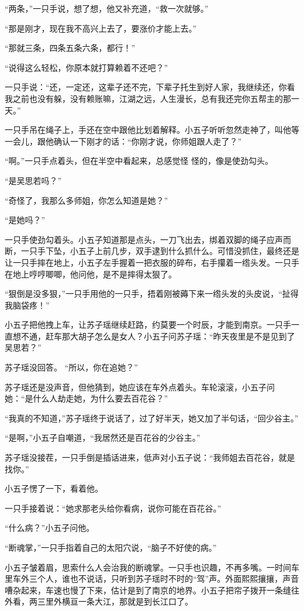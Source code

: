 “两条，”一只手说，想了想，他又补充道，“救一次就够。”

“那是刚才，现在我不高兴上去了，要涨价才能上去。”

“那就三条，四条五条六条，都行！”

“说得这么轻松，你原本就打算赖着不还吧？”

一只手说：“还，一定还，这辈子还不完，下辈子托生到好人家，我继续还，你看我之前也没有躲，没有赖账嘛，江湖之远，人生漫长，总有我还完你五帮主的那一天。”

一只手吊在绳子上，手还在空中跟他比划着解释。小五子听听忽然走神了，叫他等一会儿，跟他确认一下刚才的话：“你刚才说，你师姐跟人走了？”

“啊。”一只手点着头，但在半空中看起来，总感觉怪
怪的，像是使劲勾头。

“是吴思若吗？”

“奇怪了，我那么多师姐，你怎么知道是她？”

“是她吗？”

一只手使劲勾着头。小五子知道那是点头，一刀飞出去，绑着双脚的绳子应声而断，一只手下坠，小五子上前几步，双手逮到什么抓什么。可惜没抓住，最终还是让一只手摔在地上，小五子左手握着一把衣服的碎布，右手攥着一绺头发。一只手在地上哼哼唧唧，他问他，是不是摔得太狠了。

“狠倒是没多狠，”一只手用他的一只手，捂着刚被薅下来一绺头发的头皮说，“扯得我脑袋疼！”

小五子把他拽上车，让苏子瑶继续赶路，约莫要一个时辰，才能到南京。一只手一直想不通，赶车那大胡子怎么是女人？小五子问苏子瑶：“昨天夜里是不是见到了吴思若？”

苏子瑶没回答。 “所以，你在追她？”

苏子瑶还是没声音，但他猜到，她应该在车外点着头。车轮滚滚，小五子问她：“是什么人劫走她，为什么要去百花谷？”

“我真的不知道，”苏子瑶终于说话了，过了好半天，她又加了半句话，“回少谷主。”

“是啊，”小五子自嘲道，“我居然还是百花谷的少谷主。”

苏子瑶没接茬，一只手倒是插话进来，低声对小五子说：“我师姐去百花谷，就是找你。”

小五子愣了一下，看着他。

一只手接着说：“她求那老头给你看病，说你可能在百花谷。”

“什么病？”小五子问他。

“断魂掌，”一只手指着自己的太阳穴说，“脑子不好使的病。”

小五子皱着眉，思索什么人会治我的断魂掌。一只手也识趣，不再多嘴。一时间车里车外三个人，谁也不说话，只听到苏子瑶时不时的“驾”声。外面熙熙攘攘，声音嘈杂起来，车速也慢了下来，估计是到了南京的地界。小五子把帘子拨开一条缝往外看，两三里外横亘一条大江，那就是到长江口了。

